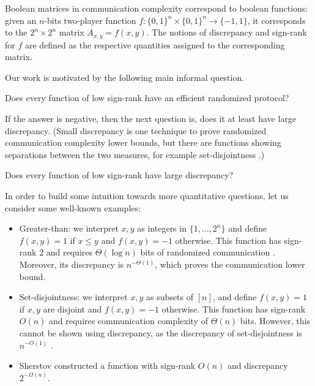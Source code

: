 \documentclass{toc}
\begin{document}
Boolean matrices in communication complexity correspond to boolean functions:
given an $n$-bits %
two-player  %
function $f:\{0,1\}^n \times \{0,1\}^n \to \{-1,1\}$, it corresponds to the $2^n \times 2^n$ matrix $A_{x,y}=f(x,y)$. The notions of discrepancy and sign-rank
for $f$ %
%
are defined as the respective quantities assigned to the
corresponding matrix.

%
%
Our work is motivated by the following main informal question.  %
\begin{problem}
Does every function of low sign-rank have an efficient randomized protocol?
\end{problem}

If the answer is negative, then the next question is, does it at least have 
large %
discrepancy.  (Small   %
discrepancy is one technique to prove randomized communication complexity lower bounds, but there are functions showing separations between the two measures,
for example set-disjointness \cite{chattopadhyay2010story}.)  %


\begin{problem}
Does every function of low sign-rank have large discrepancy?
\end{problem}

In order to build some intuition towards more quantitative questions, 
let us consider some well-known examples:


\begin{itemize}
\item Greater-than: we interpret $x,y$ as integers in $\{1,\ldots,2^n\}$ and define $f(x,y) = 1$ if $x \le y$ and $f(x,y)=-1$ otherwise. This function has sign-rank $2$ and requires $\Theta(\log n)$ bits of randomized communication \cite{nisan1993communication}. Moreover, its discrepancy is $n^{-\Theta(1)}$, which proves the communication lower bound.

\item Set-disjointness: we interpret $x,y$ as subsets of $[n]$, and define $f(x,y)=1$ if $x,y$ are disjoint and $f(x,y)=-1$ otherwise. This function has sign-rank $O(n)$ and requires communication complexity of $\Theta(n)$ bits. However, this cannot be shown using discrepancy, as the discrepancy of set-disjointness is $n^{-O(1)}$ \cite{chattopadhyay2010story}.

\item Sherstov \cite{hardestSher} constructed a function with sign-rank $O(n)$ and discrepancy $2^{-\Omega(n)}$.
\end{itemize}
\end{document}
